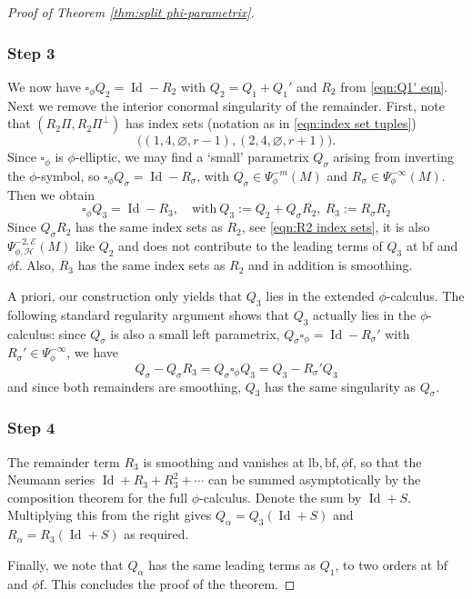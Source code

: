\documentclass[JEP,XML,SOM,Unicode,NoFloatCountersInSection,published]{cedram}
\theoremstyle{plain}
\theoremstyle{definition}
\newcommand\calE{{\mathcal E}}
\newcommand{\phif}{{\phi\mathrm{f}}}
\newcommand{\lf}{{\mathrm{lb}}}
\newcommand{\bbf}{{\mathrm{bf}}}
\DeclareMathOperator{\Id}{Id}
\newcommand{\Piperp}{\Pi^\perp}
\begin{document}
\begin{proof}[Proof of Theorem \ref{thm:split phi-parametrix}]
\subsubsection*{Step 3}
We now have $\square_\phi Q_2 = \Id - R_2$ with $Q_2=Q_1+Q_1'$ and $R_2$ from \eqref{eqn:Q1' eqn}.
Next we remove the interior conormal singularity of the remainder. First, note that $(R_2\Pi, R_2\Piperp)$
has index sets (notation as in \eqref{eqn:index set tuples})
\begin{equation}
\label{eqn:R2 index sets}
\bigl((1,4,\varnothing,r-1), (2,4,\varnothing,r+1) \bigr).
\end{equation}
Since $\square_\phi$ is $\phi$-elliptic, we may find a `small' parametrix $Q_\sigma$
arising from inverting the $\phi$-symbol, so $\square_\phi Q_\sigma = \Id -R_\sigma$,
with $Q_\sigma \in \Psi^{-m}_\phi(M)$ and $R_\sigma \in \Psi^{-\infty}_\phi(M)$.
Then we obtain
\[
\square_\phi Q_3=\Id - R_3, \quad \text{with} \ Q_3:=Q_2 + Q_\sigma R_2, \ R_3:= R_\sigma R_2
\]
Since $Q_\sigma R_2$ has the same index sets as $R_2$, see \eqref{eqn:R2 index sets}, it is
also $\Psi^{-2,\calE}_{\phi, \mathscr{H}}(M)$ like $Q_2$ and does not contribute to the leading terms
of $Q_3$ at $\bbf$ and $\phif$. Also, $R_3$ has the same index sets as $R_2$ and in addition is smoothing.

A priori, our construction only yields that $Q_3$ lies in the extended $\phi$-calculus.
The following standard regularity argument shows that $Q_3$ actually lies in the $\phi$-calculus: since $Q_\sigma$ is also a small left parametrix, $Q_\sigma\square_\phi=\Id - R_{\sigma}'$ with $R_{\sigma}'\in\Psi^{-\infty}_\phi$, we have
\[
Q_\sigma - Q_\sigma R_3 = Q_\sigma \square_\phi Q_3 = Q_3 - R_{\sigma}' Q_3
\]
and since both remainders are smoothing, $Q_3$ has the same singularity as $Q_\sigma$.

\subsubsection*{Step 4}
The remainder term $R_3$ is smoothing and vanishes at $\lf,\bbf,\phif$, so that the Neumann series $\Id+R_3+R_3^2+\cdots$ can be summed asymptotically by the composition theorem for the full $\phi$-calculus. Denote the sum by $\Id+S$. Multiplying this from the right gives $Q_\alpha =Q_3(\Id+S)$ and $R_\alpha=R_3(\Id+S)$ as required.

Finally, we note that $Q_\alpha$ has the same leading terms as $Q_1$, to two orders at $\bbf$ and $\phif$.
This concludes the proof of the theorem.
\end{proof}
\end{document}
